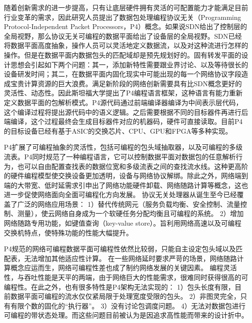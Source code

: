 随着创新需求的进一步提高，只有让底层硬件拥有灵活的可配置能力才能满足目前行业变革的需求，因此研究人员提出了数据包处理编程协议无关（Programming Protocol-Independent Packet Processors，P4）概念。如果说SDN给出了控制层的全局视野，那么协议无关可编程的数据平面给出了设备层的全局视野。SDN已经将数据平面高度抽象，操作人员可以灵活地定义数据流，以及对这种流进行怎样的操作。但是在数据平面内数据包头的匹配域却是预先规划好的。固有转发平面的设计思想会引起如下两个问题：其一，添加新特性需要跟业界讨论、以及等待很长的设备研发时间；其二，在数据平面内固化现实中可能出现的每一个网络协议字段造成宝贵计算资源的巨大浪费。满足新阶段的网络创新需要具有比SDN概念更好的灵活性、动态性。因此斯坦福大学提出了P4编程语言框架，这种语言有能力重新定义数据平面的包解析模式。P4源代码通过前端编译器编译为中间表示层代码，这个编译过程将提出源代码中的语义逻辑。之后需要根据不同的目标器件再进行后端编译，这个过程最终会生成目标器件对应的机器码，硬件可直接读取。目前P4的目标设备已经有基于ASIC的交换芯片、CPU、GPU和FPGA等多种实现。

P4扩展了可编程抽象的灵活性，包括可编程的包头域抽取器，以及可编程的多级流表。P4同时规范了一种编程语言，它可以控制数据平面对数据包的任意解析行为，也可以自由配置查找表的数据位宽和多级流表之间的查找流水线。这种更高阶的硬件编程模型使交换设备更加透明，设备与网络协议解绑。除此之外，网络端到端的大带宽、低时延需求引申出了网络功能硬件卸载、网络随路计算等概念，这也进一步促使网络面向全面可编程化方向发展。
协议无关处理器从诞生至今已经覆盖了广泛的网络应用场景：
1）替代传统网元（服务负载均衡、安全控制、流量控制、测量），使云网络自身成为一个软硬任务分配均衡且可编程的系统。
2）增加网络随路专用功能，如键值查询（key-value store）。旨利用网络高速以及可编程交换机特点，使特殊功能的性能大幅提升。

P4规范的网络可编程数据平面可编程性依然比较弱，只能自主设定包头域以及匹配表，无法增加其他适应性计算。
在一些网络延时要求严苛的场景，网络随路计算概念应运而生，网络可编程性差也成了制约网络发展的关键因素。
编程灵活性，与吞吐性能是天平的两端，由于网络巨大的性能需求，很难同时获得很高的可编程性。在此之外，也有很多特性是P4架构无法实现的：
1）包头长度有限，目前数据平面可编程的流水仅仅紧局限于处理宽度受限的包头。
2）非图灵完全，只有有限个数的固化的“执行器”。
3）没有讨论包调度问题。
4）无法对数据包进行可编程的带状态处理。而这些问题目前被认为是因追求高性能而带来的设计折中。

\label{chap113}

